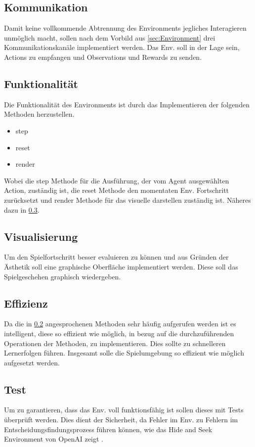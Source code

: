 \subsection{Kommunikation}
Damit keine vollkommende Abtrennung des Environments jegliches Interagieren unmöglich macht, sollen nach dem Vorbild aus \ref{sec:Environment} drei Kommunikationskanäle implementiert werden. Das Env. soll in der Lage sein, Actions zu empfangen und Observations und Rewards zu senden.

\subsection{Funktionalität} \label{sec:funktionalität_Env}
Die Funktionalität des Environments ist durch das Implementieren der folgenden Methoden herzustellen.
\begin{itemize}
	\item step
	\item reset
	\item render
\end{itemize}
Wobei die step Methode für die Ausführung, der vom Agent ausgewählten Action, zuständig ist, die reset Methode den momentaten Env. Fortschritt zurücksetzt und render Methode für das visuelle darstellen zuständig ist. Näheres dazu in \ref{sec:visualisierung_Env}.

\subsection{Visualisierung} \label{sec:visualisierung_Env}
Um den Spielfortschritt besser evaluieren zu können und aus Gründen der Ästhetik soll eine graphische Oberfläche implementiert werden. Diese soll das Spielgeschehen graphisch wiedergeben.

\subsection{Effizienz}
Da die in \ref{sec:funktionalität_Env} angesprochenen Methoden sehr häufig aufgerufen werden ist es intelligent, diese so effizient wie möglich, in bezug auf die durchzuführenden Operationen der Methoden, zu implementieren. Dies sollte zu schnelleren Lernerfolgen führen. Insgesamt solle die Spielumgebung so effizient wie möglich aufgesetzt werden.

\subsection{Test}
Um zu garantieren, dass das Env. voll funktionsfähig ist sollen dieses mit Tests überprüft werden. Dies dient der Sicherheit, da Fehler im Env. zu Fehlern im Entscheidungsfindungsprozess führen können, wie das Hide and Seek Environment von OpenAI zeigt \cite{DBLP:journals/corr/abs-1909-07528}.

